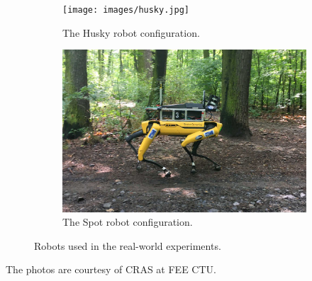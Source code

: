         \begin{figure}[H]
            \centering
            \begin{subfigure}[b]{0.495\textwidth}
                \centering
                \texttt{[image: images/husky.jpg]}
                \caption{The Husky robot configuration.}
                \label{fig:husky}
            \end{subfigure}
            \begin{subfigure}[b]{0.495\textwidth}
                \centering
                \includegraphics[width=\textwidth]{images/spot.jpg}
                \caption{The Spot robot configuration.}
                \label{fig:spot}
            \end{subfigure}
            \caption{Robots used in the real-world experiments.}
        \end{figure}
        \noindent The photos are courtesy of CRAS at FEE CTU.


